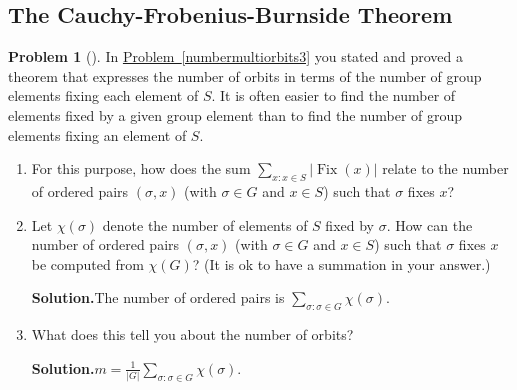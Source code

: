 \documentclass[10pt,]{book}
\theoremstyle{plain}
\theoremstyle{definition}
\newtheorem{activity}[project]{Problem}
\theoremstyle{definition}
\numberwithin{equation}{chapter}
\DeclareMathOperator{\Fix}{Fix}
\begin{document}
\subsection[{The Cauchy-Frobenius-Burnside Theorem}]{The Cauchy-Frobenius-Burnside Theorem}\label{subsection-59}
\begin{activity}[]\label{numbermultiorbits4}
In \hyperref[numbermultiorbits3]{Problem~\ref{numbermultiorbits3}} you stated and proved a theorem that expresses the number of orbits in terms of the number of group elements fixing each element of \(S\). It is often easier to find the number of elements fixed by a given group element than to find the number of group elements fixing an element of \(S\).%
\begin{enumerate}[font=\bfseries,label=(\alph*),ref=\alph*]
\item\label{task-221} For this purpose, how does the sum \(\sum_{x\colon x\in S}|\Fix(x)|\) relate to the number of ordered pairs \((\sigma,x)\) (with \(\sigma\in G\) and \(x \in S\)) such that \(\sigma\) fixes \(x\)?%
\item\label{task-222} Let \(\chi(\sigma)\) denote the number of elements of \(S\) fixed by \(\sigma\). How can the number of ordered pairs \((\sigma,x)\) (with \(\sigma\in G\) and \(x\in S\)) such that \(\sigma\) fixes \(x\) be computed from \(\chi(G)\)? (It is ok to have a summation in your answer.)%
\par\medskip\noindent%
\textbf{Solution.}\quad The number of ordered pairs is \(\sum_{\sigma\colon \sigma\in G} \chi(\sigma)\).%
\item\label{task-223} What does this tell you about the number of orbits?%
\par\medskip\noindent%
\textbf{Solution.}\quad \(m = \frac{1}{|G|}\sum_{\sigma\colon \sigma\in G} \chi(\sigma)\).%
\end{enumerate}
\end{activity}
\end{document}
